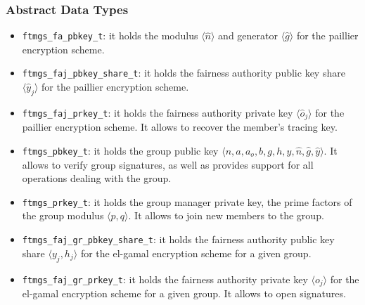 \documentclass[a4paper]{article}
\newcommand{\tuple}[1]{\ensuremath{\langle #1 \rangle}}
\begin{document}
\subsubsection*{Abstract Data Types}
\begin{itemize}\small
\item \verb|ftmgs_fa_pbkey_t|: it holds the modulus \tuple{\hat{n}} and
  generator \tuple{\hat{g}} for the paillier encryption scheme.
\item \verb|ftmgs_faj_pbkey_share_t|: it holds the fairness authority
  public key share \tuple{\hat{y}_j} for the paillier encryption scheme.
\item \verb|ftmgs_faj_prkey_t|: it holds the fairness authority
  private key \tuple{\hat{o}_j} for the paillier encryption scheme. It
  allows to recover the member's tracing key.
\item \verb|ftmgs_pbkey_t|: it holds the group public key
  \tuple{n,a,a_o,b,g,h,y,\hat{n},\hat{g},\hat{y}}. It allows to verify
  group signatures, as well as provides support for all operations
  dealing with the group.
\item \verb|ftmgs_prkey_t|: it holds the group manager private key,
  the prime factors of the group modulus \tuple{p,q}. It allows to
  join new members to the group.
\item \verb|ftmgs_faj_gr_pbkey_share_t|: it holds the fairness
  authority public key share \tuple{y_j,h_j} for the el-gamal encryption
  scheme for a given group.
\item \verb|ftmgs_faj_gr_prkey_t|: it holds the fairness authority
  private key \tuple{o_j} for the el-gamal encryption scheme for a given
  group. It allows to open signatures.
\end{itemize}
\end{document}
